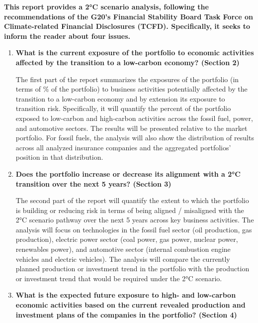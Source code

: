 \documentclass[10pt,table,a4]{article}\usepackage[]{graphicx}\usepackage[]{color}
\begin{document}
	\begin{multicols}{2}
		
		\textbf{This report provides a 2°C scenario analysis, following the recommendations of the G20's Financial Stability Board Task Force on Climate-related Financial Disclosures (TCFD). Specifically, it seeks to inform the reader about four issues.}
		
		\begin{enumerate}
			\item{\textbf{What is the current exposure of the portfolio to economic activities affected by the transition to a low-carbon economy? (Section 2) }
			}
			
			The first part of the report summarizes the exposures of the portfolio (in terms of \% of the portfolio) to business activities potentially affected by the transition to a low-carbon economy and by extension its exposure to transition risk. Specifically, it will quantify the percent of the portfolio exposed to low-carbon and high-carbon activities across the fossil fuel, power, and automotive sectors. The results will be presented relative to the market portfolio. For fossil fuels, the analysis will also show the distribution of results across all analyzed insurance companies and the aggregated portfolios' position in that distribution. 
			
			\item{\textbf{Does the portfolio increase or decrease its alignment with a 2°C transition over the next 5 years? (Section 3)}
			}
			
			The second part of the report will quantify the extent to which the portfolio is building or reducing risk in terms of being aligned / misaligned with the 2°C scenario pathway over the next 5 years across key business activities. The analysis will focus on technologies in the fossil fuel sector (oil production, gas production), electric power sector (coal power, gas power, nuclear power, renewables power), and automotive sector (internal combustion engine vehicles and electric vehicles). The analysis will compare the currently planned production or investment trend in the portfolio with the production or investment trend that would be required under the 2°C scenario. 
			
			\item{\textbf{What is the expected future exposure to high- and low-carbon economic activities based on the current revealed production and investment plans of the companies in the portfolio? (Section 4)}
			}
			

\end{enumerate}
\end{multicols}
\end{document}
